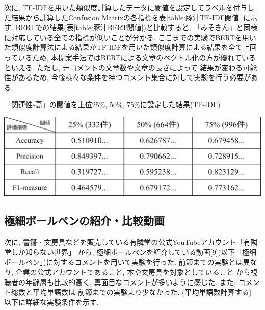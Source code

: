 \documentclass{ltjarticle}
\begin{document}
次に, TF-IDFを用いた類似度計算したデータに閾値を設定してラベルを付与した結果から計算したConfusion Matrixの各指標を表\ref{table:豚汁TF-IDF閾値}
に示す. BERTでの結果(表\ref{table:豚汁BERT閾値})と比較すると, 「みそきん」と同様に対応している全ての指標が低いことが分かる. 
ここまでの実験でBERTを用いた類似度計算法による結果がTF-IDFを用いた類似度計算による結果を全て上回っているため, 
本提案手法ではBERTによる文章のベクトル化の方が優れているといえる. ただし, 元コメントの文章数や文章の長さによって
結果が変わる可能性があるため, 今後様々な条件を持つコメント集合に対して実験を行う必要がある. 
\begin{table}[ht]
    \centering
    \caption{「関連性-高」の閾値を上位25\%, 50\%, 75\%に設定した結果(TF-IDF)}
    \vspace{5truept}

    \includegraphics[width = 13.5cm]{images/豚汁images/豚汁TF-IDF閾値.drawio.png}
    \label{table:豚汁TF-IDF閾値}
\end{table}

\newpage
\subsection{極細ボールペンの紹介・比較動画}
次に, 書籍・文房具などを販売している有隣堂の公式YouTubeアカウント「有隣堂しか知らない世界」
から, 極細ボールペンを紹介している動画[9](以下「極細ボールペン」)に対するコメントを用いて実験を行った. 
前節までの実験とは異なり, 企業の公式アカウントであること, 本や文房具を対象としていること
から視聴者の年齢層も比較的高く, 真面目なコメントが多いように感じた. また, コメント総数と平均単語数は
前節までの実験より少なかった. (平均単語数計算する)
以下に詳細な実験条件を示す. 
\vspace{10truept}
\end{document}
